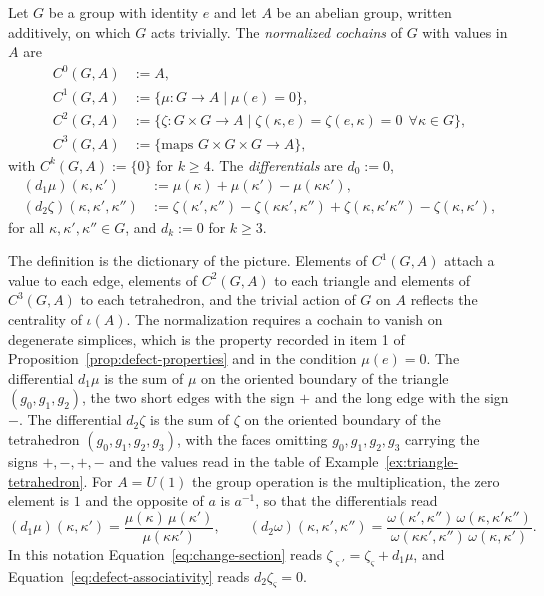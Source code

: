 \begin{definition}\label{def:group-cochains}
	Let $G$ be a group with identity $e$ and let $A$ be an abelian group, written additively, on which $G$ acts trivially. The \emph{normalized cochains} of $G$ with values in $A$ are
	\begin{align*}
		C^0(G,A)&:=A,\\
		C^1(G,A)&:=\{\mu:G\to A\mid\mu(e)=0\},\\
		C^2(G,A)&:=\big\{\zeta:G\times G\to A\mid\zeta(\kappa,e)=\zeta(e,\kappa)=0\ \ \forall\kappa\in G\big\},\\
		C^3(G,A)&:=\{\text{maps }G\times G\times G\to A\},
	\end{align*}
	with $C^k(G,A):=\{0\}$ for $k\geq4$. The \emph{differentials} are $d_0:=0$,
	\begin{align*}
		(d_1\mu)(\kappa,\kappa')&:=\mu(\kappa)+\mu(\kappa')-\mu(\kappa\kappa'),\\
		(d_2\zeta)(\kappa,\kappa',\kappa'')&:=\zeta(\kappa',\kappa'')-\zeta(\kappa\kappa',\kappa'')+\zeta(\kappa,\kappa'\kappa'')-\zeta(\kappa,\kappa'),
	\end{align*}
	for all $\kappa,\kappa',\kappa''\in G$, and $d_k:=0$ for $k\geq3$.
\end{definition}

The definition is the dictionary of the picture. Elements of $C^1(G,A)$ attach a value to each edge, elements of $C^2(G,A)$ to each triangle and elements of $C^3(G,A)$ to each tetrahedron, and the trivial action of $G$ on $A$ reflects the centrality of $\iota(A)$. The normalization requires a cochain to vanish on degenerate simplices, which is the property recorded in item 1 of Proposition~\ref{prop:defect-properties} and in the condition $\mu(e)=0$. The differential $d_1\mu$ is the sum of $\mu$ on the oriented boundary of the triangle $(g_0,g_1,g_2)$, the two short edges with the sign $+$ and the long edge with the sign $-$. The differential $d_2\zeta$ is the sum of $\zeta$ on the oriented boundary of the tetrahedron $(g_0,g_1,g_2,g_3)$, with the faces omitting $g_0,g_1,g_2,g_3$ carrying the signs $+,-,+,-$ and the values read in the table of Example~\ref{ex:triangle-tetrahedron}. For $A=U(1)$ the group operation is the multiplication, the zero element is $1$ and the opposite of $a$ is $a^{-1}$, so that the differentials read
\begin{equation*}
	(d_1\mu)(\kappa,\kappa')=\frac{\mu(\kappa)\,\mu(\kappa')}{\mu(\kappa\kappa')}, \qquad (d_2\omega)(\kappa,\kappa',\kappa'')=\frac{\omega(\kappa',\kappa'')\,\omega(\kappa,\kappa'\kappa'')}{\omega(\kappa\kappa',\kappa'')\,\omega(\kappa,\kappa')}.
\end{equation*}
In this notation Equation~\eqref{eq:change-section} reads $\zeta_{\varsigma'}=\zeta_\varsigma+d_1\mu$, and Equation~\eqref{eq:defect-associativity} reads $d_2\zeta_\varsigma=0$.

